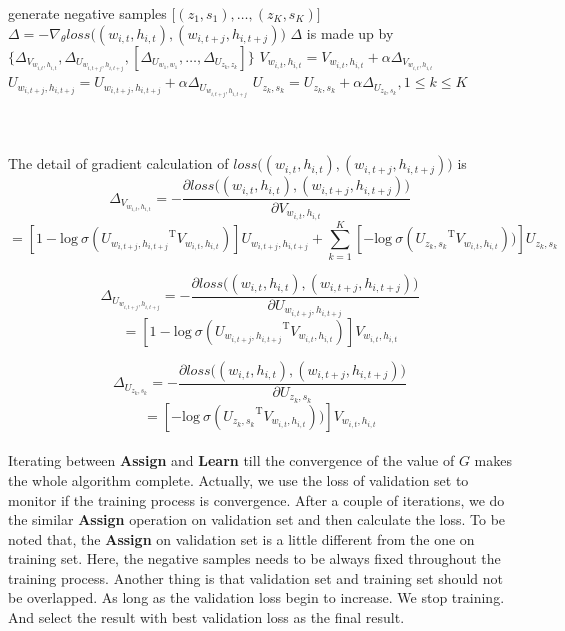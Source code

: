 \begin{algorithmic}
 
	  
        				\State generate negative samples $\big [(z_1,s_1),\ldots,(z_K,s_K)\big ]$
        				\State $\Delta = -\nabla_\theta loss\big ( (w_{i,t},h_{i,t}),(w_{i,t+j},h_{i,t+j})\big )$
        				\State $\Delta$ is made up by $ \{\Delta_{V_{w_{i,t},h_{i,t}}}, \Delta_{U_{w_{i,t+j},h_{i,t+j}}}, [\Delta_{U_{w_1,w_1}},\ldots,\Delta_{U_{z_k,z_k}}]\}$
        				\State $V_{w_{i,t},h_{i,t}} = V_{w_{i,t},h_{i,t}} + \alpha \Delta_{V_{w_{i,t},h_{i,t}}}$
        				\State $U_{w_{i,t+j},h_{i,t+j}} = U_{w_{i,t+j},h_{i,t+j}} + \alpha \Delta_{U_{w_{i,t+j},h_{i,t+j}}}$ 
        				\State $U_{z_k,s_k} = U_{z_k,s_k} + \alpha \Delta_{U_{z_k,s_k}}, 1\leq k\leq K$ 
    				\EndIf
		\EndFor
	\EndFor			
\EndFor			
\EndProcedure
\end{algorithmic}			

\subparagraph{}\

The detail of gradient calculation of $loss\big ( (w_{i,t},h_{i,t}),(w_{i,t+j},h_{i,t+j})\big )$ is
$$\Delta_{V_{w_{i,t},h_{i,t}}} = -\frac{\partial loss\big ( (w_{i,t},h_{i,t}),(w_{i,t+j},h_{i,t+j})\big )}{\partial V_{w_{i,t},h_{i,t}}} $$
$$= [1-\mathrm{log}\ \sigma({U_{w_{i,t+j},h_{i,t+j}}}^{\mathrm{T}}V_{w_{i,t},h_{i,t}})]
U_{w_{i,t+j},h_{i,t+j}}+\sum_{k=1}^K [-\mathrm{log}\ \sigma({U_{z_k,s_k}}^{\mathrm{T}}V_{w_{i,t},h_{i,t}}))]U_{z_k,s_k}$$

$$\Delta_{U_{w_{i,t+j},h_{i,t+j}}} = -\frac{\partial loss\big ( (w_{i,t},h_{i,t}),(w_{i,t+j},h_{i,t+j})\big )}{\partial U_{w_{i,t+j},h_{i,t+j}}}$$
$$=[1-\mathrm{log}\ \sigma({U_{w_{i,t+j},h_{i,t+j}}}^{\mathrm{T}}V_{w_{i,t},h_{i,t}})]
V_{w_{i,t},h_{i,t}}$$

$$\Delta_{U_{z_k,s_k}} = -\frac{\partial loss\big ( (w_{i,t},h_{i,t}),(w_{i,t+j},h_{i,t+j})\big )}{\partial U_{z_k,s_k}}$$
$$=[-\mathrm{log}\ \sigma({U_{z_k,s_k}}^{\mathrm{T}}V_{w_{i,t},h_{i,t}}))]V_{w_{i,t},h_{i,t}}$$


\paragraph{}
Iterating between \textbf{Assign} and \textbf{Learn} till the convergence of the value of $G$ makes the whole algorithm complete. Actually, we use the loss of validation set to monitor if the training process is convergence. After a couple of iterations, we do the similar \textbf{Assign} operation on validation set and then calculate the loss. To be noted that, the \textbf{Assign} on validation set is a little different from the one on training set. Here, the negative samples needs to be always fixed throughout the training process. Another thing is that validation set and training set should not be overlapped. As long as the validation loss begin to increase.  We stop training. And select the result with best validation loss as the final result. 

